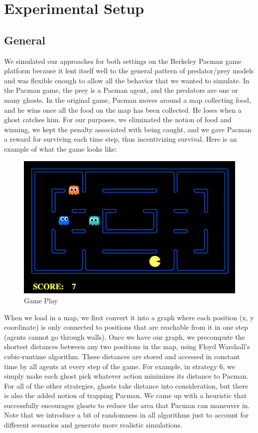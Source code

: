 \documentclass[11pt]{article}
\begin{document}
\section{Experimental Setup}
\subsection{General}
We simulated our approaches for both settings on the Berkeley Pacman game platform because it lent itself well to the general pattern of predator/prey models and was flexible enough to allow all the behavior that we wanted to simulate. In the Pacman game, the prey is a Pacman agent, and the predators are one or many ghosts. In the original game, Pacman moves around a map collecting food, and he wins once all the food on the map has been collected. He loses when a ghost catches him. For our purposes, we eliminated the notion of food and winning, we kept the penalty associated with being caught, and we gave Pacman a reward for surviving each time step, thus incentivizing survival. Here is an example of what the game looks like: \\

\begin{figure}[H]
	\includegraphics[width=\columnwidth]{examplemap.png}
	\caption{Game Play}
	\label{fig:gameplay}
\end{figure}

When we load in a map, we first convert it into a graph where each position (x, y coordinate) is only connected to positions that are reachable from it in one step (agents cannot go through walls). Once we have our graph, we precompute the shortest distances between any two positions in the map, using Floyd Warshall's cubic-runtime algorithm. These distances are stored and accessed in constant time by all agents at every step of the game. For example, in strategy 6, we simply make each ghost pick whatever action minimizes its distance to Pacman. For all of the other strategies, ghosts take distance into consideration, but there is also the added notion of trapping Pacman. We came up with a heuristic that successfully encourages ghosts to reduce the area that Pacman can maneuver in. Note that we introduce a bit of randomness in all algorithms just to account for different scenarios and generate more realistic simulations.
\end{document}
